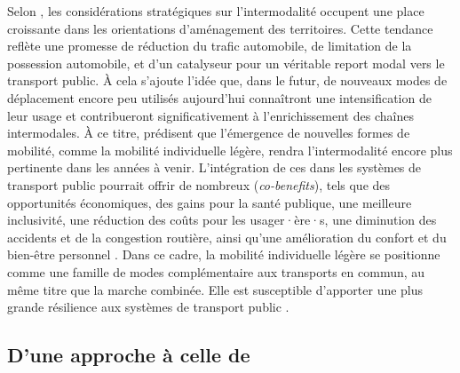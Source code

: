 \begin{refsegment}
Selon \textcolor{blue}{\textcite[116]{goletz_intermodality_2020}}, les considérations stratégiques sur l’intermodalité occupent une place croissante dans les orientations d’aménagement des territoires. Cette tendance reflète une promesse de réduction du trafic automobile, de limitation de la possession automobile, et d’un catalyseur pour un véritable report modal vers le transport public. À cela s’ajoute l’idée que, dans le futur, de nouveaux modes de déplacement encore peu utilisés aujourd’hui connaîtront une intensification de leur usage et contribueront significativement à l’enrichissement des chaînes intermodales. À ce titre, \textcolor{blue}{\textcite[77]{oostendorp_combining_2018}} prédisent que l’émergence de nouvelles formes de mobilité, comme la mobilité individuelle légère, rendra l’intermodalité encore plus pertinente dans les années à venir. L’intégration de ces  dans les systèmes de transport public pourrait offrir de nombreux  (\textsl{co-benefits}), tels que des opportunités économiques, des gains pour la santé publique, une meilleure inclusivité, une réduction des coûts pour les usager·ère·s, une diminution des accidents et de la congestion routière, ainsi qu’une amélioration du confort et du bien-être personnel \textcolor{blue}{\autocite[39-40]{litman_new_2021}}. Dans ce cadre, la mobilité individuelle légère se positionne comme une famille de modes complémentaire aux transports en commun, au même titre que la marche combinée. Elle est susceptible d’apporter une plus grande résilience aux systèmes de transport public \textcolor{blue}{\autocites{heran_velo_2020}[6]{dezobry_du_2020}}.%

\subsection{D'une approche  à celle de 
    \label{chap1:btod-definition}
    }


\end{refsegment}
